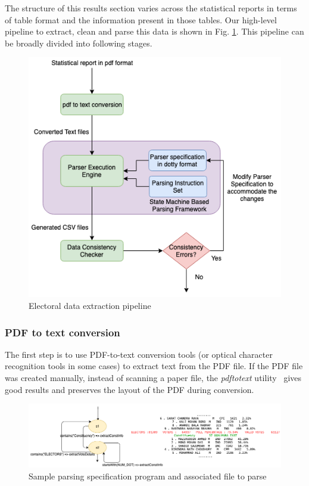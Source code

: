The structure of this results section varies across the statistical reports in terms of table format and the information present in those tables. Our high-level pipeline to extract, clean and parse this data is shown in Fig. \ref{fig:extraction-pipeline}. This pipeline can be broadly divided into following stages. 
\begin{figure}[h!]
  \includegraphics[scale=0.5]{ExtractionPipeline.png}
  \caption{Electoral data extraction pipeline}
  \label{fig:extraction-pipeline}
\end{figure}

\subsubsection{PDF to text conversion} The first step is to use PDF-to-text conversion tools (or optical character recognition tools in some cases) to extract text from the PDF file. If the PDF file was created manually, instead of scanning a paper file, the {\it pdftotext} utility~\cite{pdftotext} gives good results and preserves the layout of the PDF during conversion.

\begin{figure}
\begin{minipage}{\textwidth}
  \includegraphics[scale=0.5]{sm-spec.png}
\end{minipage}
\caption{Sample parsing specification program and associated file to parse}
  \label{fig:sample-sm-spec}
\end{figure}

